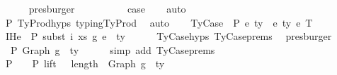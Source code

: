 \begin{isabellebody}
\ \ \ \ \isamarkupfalse%
\ presburger\isanewline
\ \ \ \ \isamarkupfalse%
\isanewline
\isanewline
\ \ \isamarkupfalse%
\ \isamarkupfalse%
\ {\isacharquery}{\kern0pt}case\isanewline
\ \ \isamarkupfalse%
\ auto\isanewline
\ \ \ \ \ \isamarkupfalse%
\ P{}\ TyProd{\isachardot}{\kern0pt}hyps{\isacharparenleft}{\kern0pt}{}{\isacharcomma}{\kern0pt}{}{\isacharcomma}{\kern0pt}{}{\isacharcomma}{\kern0pt}{}{\isacharparenright}{\kern0pt}\ typing{\isachardot}{\kern0pt}TyProd\ \isamarkupfalse%
\ auto\isanewline
{}\isamarkupfalse%
\isanewline
\ \ \isamarkupfalse%
\ {\isacharparenleft}{\kern0pt}TyCase\ {\isasymGamma}\ P\ e{}\ ty{}{\isacharprime}{\kern0pt}\ {\isasymGamma}{}{\isacharprime}{\kern0pt}\ e{}\ ty{}{\isacharprime}{\kern0pt}\ e{}\ T{\isacharparenright}{\kern0pt}\isanewline
\isanewline
\ \ \isamarkupfalse%
\ IHe{}{\isacharcolon}{\kern0pt}\ {\isachardoublequoteopen}{\isasymGamma}{}\ {\isasymturnstile}{\isacharbraceleft}{\kern0pt}P{\isacharbraceright}{\kern0pt}\ subst\ i\ xs\ g{}\ e{}\ {\isacharcolon}{\kern0pt}\ ty{}{\isacharprime}{\kern0pt}{\isachardoublequoteclose}\isanewline
\ \ \ \ \isamarkupfalse%
\ TyCase{\isachardot}{\kern0pt}hyps{\isacharparenleft}{\kern0pt}{}{\isacharparenright}{\kern0pt}\ TyCase{\isachardot}{\kern0pt}prems{\isacharparenleft}{\kern0pt}{}{\isacharcomma}{\kern0pt}{}{\isacharcomma}{\kern0pt}{}{\isacharcomma}{\kern0pt}{}{\isacharcomma}{\kern0pt}{}{\isacharparenright}{\kern0pt}\ \isamarkupfalse%
\ presburger\isanewline
\isanewline
\ \ \isamarkupfalse%
\ {\isachardoublequoteopen}{\isasymGamma}{}\ {\isasymturnstile}{\isacharbraceleft}{\kern0pt}P{\isacharbraceright}{\kern0pt}\ Graph\ g{}\ {\isacharcolon}{\kern0pt}\ ty{}{\isachardoublequoteclose}\isanewline
\ \ \ \ \isamarkupfalse%
\ {\isacharparenleft}{\kern0pt}simp\ add{\isacharcolon}{\kern0pt}\ TyCase{\isachardot}{\kern0pt}prems{\isacharparenleft}{\kern0pt}{}{\isacharparenright}{\kern0pt}{\isacharparenright}{\kern0pt}\isanewline
\ \ \isamarkupfalse%
\ \isamarkupfalse%
\ P{}{\isacharcolon}{\kern0pt}\ {\isachardoublequoteopen}{\isasymGamma}{}{\isacharprime}{\kern0pt}\ {\isacharat}{\kern0pt}\ {\isasymGamma}{}\ {\isasymturnstile}{\isacharbraceleft}{\kern0pt}P{\isacharbraceright}{\kern0pt}\ {\isacharparenleft}{\kern0pt}lift\ {}\ {\isacharcircum}{\kern0pt}{\isacharcircum}{\kern0pt}\ length\ {\isasymGamma}{}{\isacharprime}{\kern0pt}{\isacharparenright}{\kern0pt}\ {\isacharparenleft}{\kern0pt}Graph\ g{}{\isacharparenright}{\kern0pt}\ {\isacharcolon}{\kern0pt}\ ty{}{\isachardoublequoteclose}\isanewline

\end{isabellebody}
